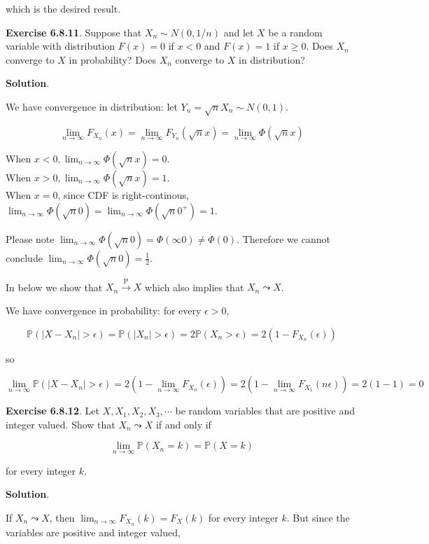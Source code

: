 which is the desired result.

\textbf{Exercise 6.8.11}. Suppose that \(X_{n} \sim N(0, 1/n)\) and let
\(X\) be a random variable with distribution \(F(x) = 0\) if \(x < 0\)
and \(F(x) = 1\) if \(x \geq 0\). Does \(X_{n}\) converge to \(X\) in
probability? Does \(X_{n}\) converge to \(X\) in distribution?

\textbf{Solution}.

We have convergence in distribution: let
\(Y_{n} = \sqrt{n}X_{n} \sim N(0,1)\).

\[ \lim_{n \rightarrow \infty} F_{X_{n}}(x) = \lim_{n \rightarrow \infty} F_{Y_{n}} (\sqrt{n}x) = \lim_{n \rightarrow \infty} \Phi(\sqrt{n}x) \]

When \(x < 0, \lim_{n \rightarrow \infty} \Phi(\sqrt{n}x) = 0\).\\
When \(x > 0, \lim_{n \rightarrow \infty} \Phi(\sqrt{n}x) = 1\).\\
When \(x = 0\), since CDF is right-continous,
\(\lim_{n \rightarrow \infty} \Phi(\sqrt{n}0)=\lim_{n \rightarrow \infty} \Phi(\sqrt{n}0^+) = 1\).

Please note
\(\lim_{n \rightarrow \infty} \Phi(\sqrt{n}0) =  \Phi(\infty 0) \neq \Phi(0)\).
Therefore we cannot conclude
\(\lim_{n \rightarrow \infty} \Phi(\sqrt{n}0) = \frac{1}{2}\).

In below we show that \(X_{n} \xrightarrow{\text{P}} X\) which also
implies that \(X_{n} \leadsto X\).

We have convergence in probability: for every \(\epsilon > 0\),

\[ \mathbb{P}(|X - X_{n}| > \epsilon) = \mathbb{P}(|X_{n}| > \epsilon) = 2 \mathbb{P}(X_{n} > \epsilon) = 2 (1 - F_{X_{n}}(\epsilon))\]

so

\[ \lim _{n \rightarrow \infty} \mathbb{P}(|X - X_{n}| > \epsilon)  = 2 (1 - \lim _{n \rightarrow \infty} F_{X_{n}}(\epsilon)) =  2 (1 - \lim _{n \rightarrow \infty} F_{X_{1}}(n \epsilon)) = 2 (1 - 1) = 0 \]

\textbf{Exercise 6.8.12}. Let \(X, X_{1}, X_{2}, X_{3}, \cdots\) be random
variables that are positive and integer valued. Show that
\(X_{n} \leadsto X\) if and only if

\[ \lim _{n \rightarrow \infty} \mathbb{P}(X_{n} = k) = \mathbb{P}(X = k) \]

for every integer \(k\).

\textbf{Solution}.

If \(X_{n} \leadsto X\), then
\(\lim _{n \rightarrow \infty} F_{X_{n}}(k) = F_X(k)\) for every integer
\(k\). But since the variables are positive and integer valued,

